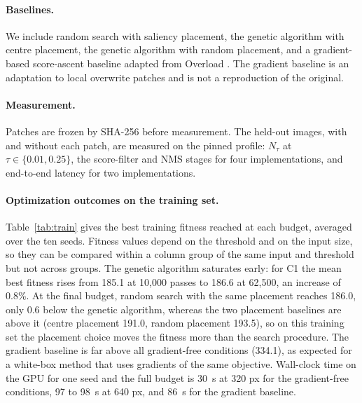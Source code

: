 \documentclass[a4paper,fleqn]{cas-dc}
\newcommand{\Ntau}{N_{\tau}}
\begin{document}
\paragraph{Baselines.}
We include random search with saliency placement, the genetic algorithm with centre placement, the genetic algorithm with random placement, and a gradient-based score-ascent baseline adapted from Overload \cite{overload2024}. The gradient baseline is an adaptation to local overwrite patches and is not a reproduction of the original.
\paragraph{Measurement.}
Patches are frozen by SHA-256 before measurement. The held-out images, with and without each patch, are measured on the pinned profile: $\Ntau$ at $\tau\in\{0.01,0.25\}$, the score-filter and NMS stages for four implementations, and end-to-end latency for two implementations.
\paragraph{Optimization outcomes on the training set.}
Table~\ref{tab:train} gives the best training fitness reached at each budget, averaged over the ten seeds. Fitness values depend on the threshold and on the input size, so they can be compared within a column group of the same input and threshold but not across groups. The genetic algorithm saturates early: for C1 the mean best fitness rises from 185.1 at 10{,}000 passes to 186.6 at 62{,}500, an increase of 0.8\%. At the final budget, random search with the same placement reaches 186.0, only 0.6 below the genetic algorithm, whereas the two placement baselines are above it (centre placement 191.0, random placement 193.5), so on this training set the placement choice moves the fitness more than the search procedure. The gradient baseline is far above all gradient-free conditions (334.1), as expected for a white-box method that uses gradients of the same objective. Wall-clock time on the GPU for one seed and the full budget is 30~s at 320 px for the gradient-free conditions, 97 to 98~s at 640 px, and 86~s for the gradient baseline.
\end{document}
